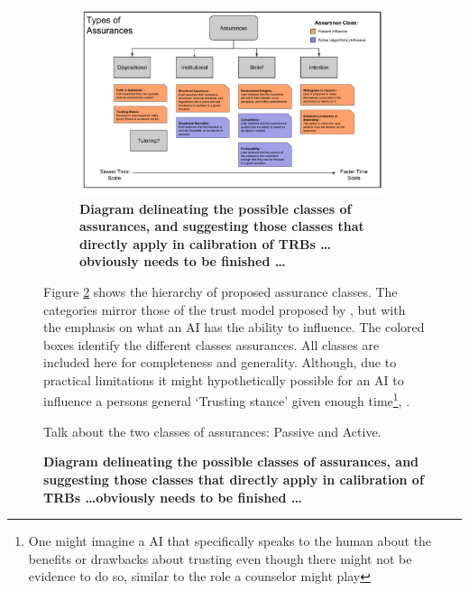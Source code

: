 \begin{figure}[htbp]
	\begin{figure}
        \includegraphics[width=8in]{Figures/Assurances.pdf}%
    	\caption{\textbf{Diagram delineating the possible classes of assurances, and suggesting those classes that directly apply in calibration of TRBs \ldots obviously needs to be finished \ldots}}
        \label{fig:Assurance_classes}
    \end{figure}

    Figure \ref{fig:Assurance_classes} shows the hierarchy of proposed assurance classes. The categories mirror those of the trust model proposed by \citet{McKnight2001-fa}, but with the emphasis on what an AI has the ability to influence. The colored boxes identify the different classes assurances. All classes are included here for completeness and generality. Although, due to practical limitations it might hypothetically possible for an AI to influence a persons general `Trusting stance' given enough time\footnote{One might imagine a AI that specifically speaks to the human about the benefits or drawbacks about trusting even though there might not be evidence to do so, similar to the role a counselor might play}, .

    Talk about the two classes of assurances: Passive and Active.


\end{figure}
